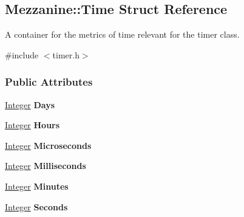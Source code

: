 \hypertarget{structMezzanine_1_1Time}{
\subsection{Mezzanine::Time Struct Reference}
\label{structMezzanine_1_1Time}
}


A container for the metrics of time relevant for the timer class.  




{\ttfamily \#include $<$timer.h$>$}

\subsubsection*{Public Attributes}
\begin{DoxyCompactItemize}
\item 
\hypertarget{structMezzanine_1_1Time_a5af7b91bff2a2f42d0b1ba4db5ecf184}{
\hyperlink{namespaceMezzanine_ac3576e52af3c62d13dde94829e0c5465}{Integer} {\bfseries Days}}
\label{structMezzanine_1_1Time_a5af7b91bff2a2f42d0b1ba4db5ecf184}

\item 
\hypertarget{structMezzanine_1_1Time_ad2984dcce2a5ad795167675d51f0aa85}{
\hyperlink{namespaceMezzanine_ac3576e52af3c62d13dde94829e0c5465}{Integer} {\bfseries Hours}}
\label{structMezzanine_1_1Time_ad2984dcce2a5ad795167675d51f0aa85}

\item 
\hypertarget{structMezzanine_1_1Time_a8db6ed8f12b5983e5cd15c84a1630475}{
\hyperlink{namespaceMezzanine_ac3576e52af3c62d13dde94829e0c5465}{Integer} {\bfseries Microseconds}}
\label{structMezzanine_1_1Time_a8db6ed8f12b5983e5cd15c84a1630475}

\item 
\hypertarget{structMezzanine_1_1Time_ad01760805e4d84573acac46e07140ee0}{
\hyperlink{namespaceMezzanine_ac3576e52af3c62d13dde94829e0c5465}{Integer} {\bfseries Milliseconds}}
\label{structMezzanine_1_1Time_ad01760805e4d84573acac46e07140ee0}

\item 
\hypertarget{structMezzanine_1_1Time_ac7fb5578056fad4045d5cda0f2baa42a}{
\hyperlink{namespaceMezzanine_ac3576e52af3c62d13dde94829e0c5465}{Integer} {\bfseries Minutes}}
\label{structMezzanine_1_1Time_ac7fb5578056fad4045d5cda0f2baa42a}

\item 
\hypertarget{structMezzanine_1_1Time_a5d47e63a53b6539e8bc17c61b069da58}{
\hyperlink{namespaceMezzanine_ac3576e52af3c62d13dde94829e0c5465}{Integer} {\bfseries Seconds}}
\label{structMezzanine_1_1Time_a5d47e63a53b6539e8bc17c61b069da58}

\end{DoxyCompactItemize}


